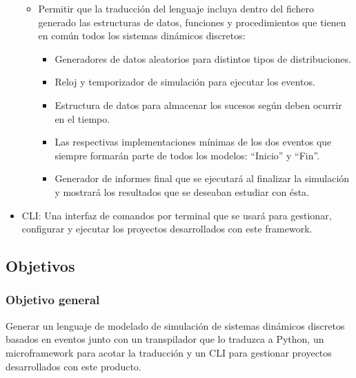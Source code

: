 \begin{itemize}
\begin{itemize}
        \item Permitir que la traducción del lenguaje incluya dentro del fichero
        generado las estructuras de datos, funciones y procedimientos que tienen
        en común todos los sistemas dinámicos discretos:
        \begin{itemize}
            \item Generadores de datos aleatorios para distintos tipos de
            distribuciones.
            \item Reloj y temporizador de simulación para ejecutar los eventos.
            \item Estructura de datos para almacenar los sucesos según deben
            ocurrir en el tiempo.
            \item Las respectivas implementaciones mínimas de los dos eventos
            que siempre formarán parte de todos los modelos: “Inicio” y “Fin”.
            \item Generador de informes final que se ejecutará al finalizar la
            simulación y mostrará los resultados que se deseaban estudiar con
            ésta.
        \end{itemize}
    \end{itemize}
    \item CLI: Una interfaz de comandos por terminal que se usará para
    gestionar, configurar y ejecutar los proyectos desarrollados con este
    framework.
\end{itemize}

\subsection{Objetivos}

\subsubsection{Objetivo general}
Generar un lenguaje de modelado de simulación de sistemas dinámicos discretos
basados en eventos junto con un transpilador que lo traduzca a Python, un
microframework para acotar la traducción y un CLI para gestionar proyectos
desarrollados con este producto.

